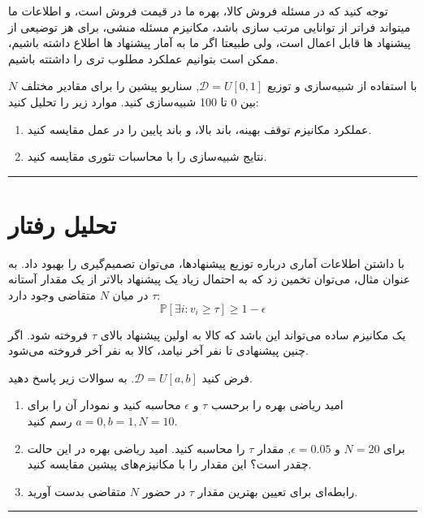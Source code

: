 \documentclass[a4paper]{article}
\begin{document}
توجه کنید که در مسئله فروش کالا، بهره ما در قیمت فروش است، و اطلاعات ما میتواند فراتر از توانایی مرتب سازی باشد، مکانیزم مسئله منشی، برای هز توضیعی از 
پیشنهاد ها قابل اعمال است، ولی طبیعتا اگر ما به آمار پیشنهاد ها اطلاع داشته باشیم، ممکن است بتوانیم عملکرد مطلوب تری را داشتته باشیم.

\vspace{5mm}{\color{SimQColor}\hrule}
\begin{SimQuestion}
	با استفاده از شبیه‌سازی  و توزیع $\mathcal{D}=U[0,1]$, سناریو پیشین را برای مقادیر مختلف $N$ بین 0 تا 100 شبیه‌سازی کنید. موارد زیر را تحلیل کنید:

\begin{enumerate}
    \item عملکرد مکانیزم توقف بهینه، باند بالا، و باند پایین را در عمل مقایسه کنید.
    \item نتایج شبیه‌سازی را با محاسبات تئوری مقایسه کنید.
\end{enumerate}
\end{SimQuestion}
{\color{SimQColor}\hrule}\vspace{5mm}

\section{تحلیل رفتار}

با داشتن اطلاعات آماری درباره توزیع پیشنهادها، می‌توان تصمیم‌گیری را بهبود داد. به عنوان مثال، می‌توان تخمین زد که به احتمال زیاد یک پیشنهاد بالاتر از یک مقدار آستانه $\tau$ در میان $N$ متقاضی وجود دارد:
\[
\mathbb{P}[\exists i: v_i \geq \tau] \geq 1-\epsilon
\]

یک مکانیزم ساده می‌تواند این باشد که کالا به اولین پیشنهاد بالای $\tau$ فروخته شود. اگر چنین پیشنهادی تا نفر آخر نیامد، کالا به نفر آخر فروخته می‌شود.

\vspace{5mm}{\color{ThQColor}\hrule}
\begin{ThQuestion}
	فرض کنید $\mathcal{D}=U[a,b]$. به سوالات زیر پاسخ دهید.

\begin{enumerate}
    \item امید ریاضی بهره را برحسب $\tau$ و $\epsilon$ محاسبه کنید و نمودار آن را برای $a=0, b=1, N=10$ رسم کنید.
    \item برای $N=20$ و $\epsilon=0.05$, مقدار $\tau$ را محاسبه کنید. امید ریاضی بهره در این حالت چقدر است؟ این مقدار را با مکانیزم‌های پیشین مقایسه کنید.
    \item رابطه‌ای برای تعیین بهترین مقدار $\tau$ در حضور $N$ متقاضی بدست آورید. 
\end{enumerate}
\end{ThQuestion}
{\color{ThQColor}\hrule}\vspace{5mm}
\end{document}
